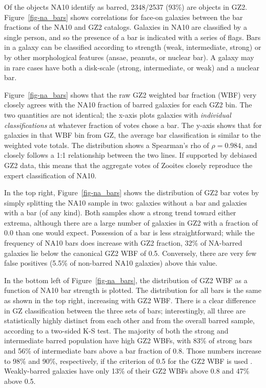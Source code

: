 \documentclass[useAMS,usenatbib]{mn2e}
\begin{document}
Of the objects NA10 identify as barred, 2348/2537 (93\%) are objects in GZ2. Figure~\ref{fig-na_bars} shows correlations for face-on galaxies between the bar fractions of the NA10 and GZ2 catalogs. Galaxies in NA10 are classified by a single person, and so the presence of a bar is indicated with a series of flags. Bars in a galaxy can be classified according to strength (weak, intermediate, strong) or by other morphological features (ansae, peanuts, or nuclear bar). A galaxy may in rare cases have both a disk-scale (strong, intermediate, or weak) and a nuclear bar. 

Figure~\ref{fig-na_bars} shows that the raw GZ2 weighted bar fraction (WBF) very closely agrees with the NA10 fraction of barred galaxies for each GZ2 bin. The two quantities are not identical; the x-axis plots galaxies with {\it individual classifications} at whatever fraction of votes chose a bar. The y-axis shows that for galaxies in that WBF bin from GZ, the average bar classification is similar to the weighted vote totals. The distribution shows a Spearman's rho of $\rho=0.984$, and closely follows a 1:1 relationship between the two lines. If supported by debiased GZ2 data, this means that the aggregate votes of Zooites closely reproduce the expert classification of NA10. 

In the top right, Figure~\ref{fig-na_bars} shows the distribution of GZ2 bar votes by simply splitting the NA10 sample in two: galaxies without a bar and galaxies with a bar (of any kind). Both samples show a strong trend toward either extrema, although there are a large number of galaxies in GZ2 with a fraction of 0.0 than one would expect. Possession of a bar is less straightforward; while the frequency of NA10 bars does increase with GZ2 fraction, 32\% of NA-barred galaxies lie below the canonical GZ2 WBF of 0.5. Conversely, there are very few false positives (5.5\% of non-barred NA10 galaxies) above this value. 

In the bottom left of Figure~\ref{fig-na_bars}, the distribution of GZ2 WBF as a function of NA10 bar strength is plotted. The distribution for all bars is the same as shown in the top right, increasing with GZ2 WBF. There is a clear difference in GZ classification between the three sets of bars; interestingly, all three are statistically highly distinct from each other and from the overall barred sample, according to a two-sided K-S test. The majority of both the strong and intermediate barred population have high GZ2 WBFs, with 83\% of strong bars and 56\% of intermediate bars above a bar fraction of 0.8. Those numbers increase to 98\% and 90\%, respectively, if the criterion of 0.5 for the GZ2 WBF is used \citep{mas11c}. Weakly-barred galaxies have only 13\% of their GZ2 WBFs above 0.8 and 47\% above 0.5. 
\end{document}
